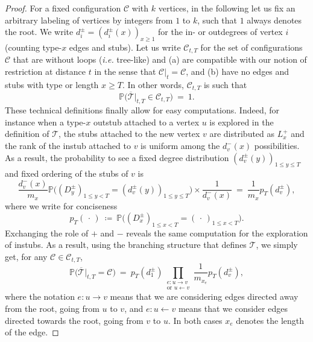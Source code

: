 \begin{refsegment}
\begin{proof}
For a fixed configuration $\mathcal{C}$ with $k$ vertices, in the
following let us fix an arbitrary labeling of vertices by integers
from $1$ to $k$, such that $1$ always denotes the root. We write
$d_i^\pm=(d_i^\pm(x))_{x\geq 1}$ for the in- or outdegrees of vertex
$i$ (counting type-$x$ edges and stubs). Let us write
$\mathscr{C}_{t,T}$ for the set of configurations $\mathcal{C}$ that
are without loops (\textit{i.e.} tree-like) and
(a) are compatible with our notion of restriction at distance $t$ in the
sense that $\mathcal{C}|_t = \mathcal{C}$, and (b) have no edges and
stubs with type or length $x\geq T$.
In other words, $\mathscr{C}_{t,T}$ is such that
\[
  \mathbb{P}\big(\overline{\mathcal{T}}|_{t,T} \in
  \mathscr{C}_{t,T}\big)\ =\ 1.
\]
These technical definitions finally allow for easy computations.
Indeed, for instance when a type-$x$ outstub attached to a vertex $u$
is explored in the definition of $\mathcal{T}$, the stubs attached to
the new vertex $v$ are distributed as $L^+_x$ and the rank of the
instub attached to $v$ is uniform among the $d_v^-(x)$ possibilities.
As a result, the probability to see a fixed degree distribution
$(d_v^\pm(y))_{1\leq y \leq T}$ and fixed ordering of the stubs of $v$ is
\[
  \frac{d_v^-(x)}{m_x}\mathbb{P}\big((D^\pm_y)_{1\leq y < T}=
  (d_v^\pm(y))_{1\leq y\leq T}\big) \times \frac{1}{d_v^-(x)} \ =\
  \frac{1}{m_x} p_T(d_v^\pm),
\]
where we write for conciseness
\[
  p_T(\,\cdot\,) \ \coloneqq\ \mathbb{P}\big((D^\pm_x)_{1\leq x < T}= (\,\cdot\,)_{1\leq x < T}\big).
\]
Exchanging the role of $+$ and $-$ reveals the same computation for
the exploration of instubs. As a result, using the branching structure
that defines $\mathcal{T}$, we simply get, for any
$\mathcal{C}\in \mathscr{C}_{t,T}$,
\begin{equation}\label{eq:prob_C_branching}
  \mathbb{P}\big( \overline{\mathcal{T}}|_{t,T} = \mathcal{C}\big)
  \ =\ p_T(d^\pm_{1})
  \prod_{\substack{e: u\rightarrow v \\ \text{or }u\leftarrow v}} \frac{1}{m_{x_e}}p_T(d^\pm_{v}),
\end{equation}
where the notation $e:u\to v$ means that we are considering edges
directed away from the root, going from $u$ to $v$, and
$e:u\leftarrow v$ means that we consider edges directed towards the
root, going from $v$ to $u$. In both cases $x_e$ denotes the length of
the edge.


\end{proof}
\end{refsegment}
